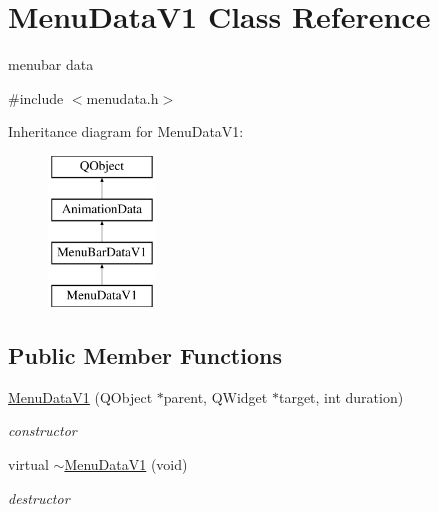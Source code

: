 \hypertarget{class_menu_data_v1}{}\section{Menu\+Data\+V1 Class Reference}
\label{class_menu_data_v1}


menubar data  




{\ttfamily \#include $<$menudata.\+h$>$}

Inheritance diagram for Menu\+Data\+V1\+:\begin{figure}[H]
\begin{center}
\leavevmode
\includegraphics[height=4.000000cm]{class_menu_data_v1}
\end{center}
\end{figure}
\subsection*{Public Member Functions}
\begin{DoxyCompactItemize}
\item 
\mbox{\label{class_menu_data_v1_a486ede01f2b9bf2b183575f27cc7e12e}} 
\hyperlink{class_menu_data_v1_a486ede01f2b9bf2b183575f27cc7e12e}{Menu\+Data\+V1} (Q\+Object $\ast$parent, Q\+Widget $\ast$target, int duration)
\begin{DoxyCompactList}\small\item\em constructor \end{DoxyCompactList}\item 
\mbox{\label{class_menu_data_v1_afc5d2f24eeaffdcbc91348749cbbabc1}} 
virtual \hyperlink{class_menu_data_v1_afc5d2f24eeaffdcbc91348749cbbabc1}{$\sim$\+Menu\+Data\+V1} (void)
\begin{DoxyCompactList}\small\item\em destructor \end{DoxyCompactList}\end{DoxyCompactItemize}
